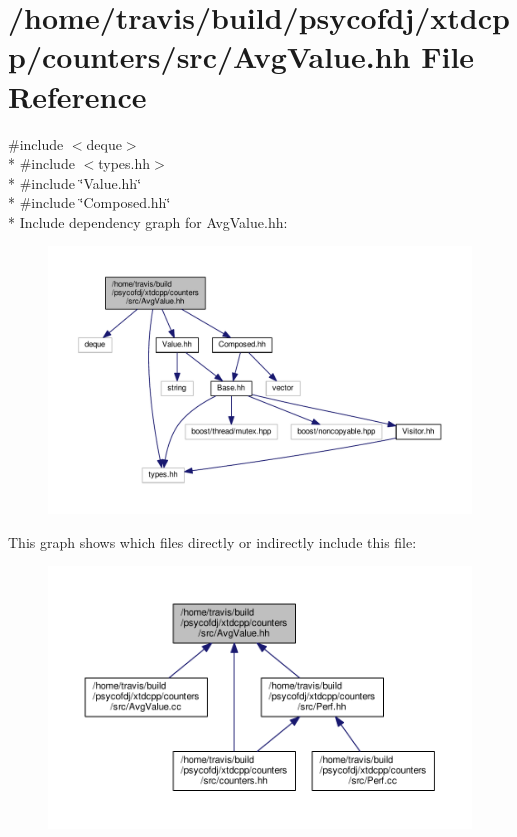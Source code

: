 \hypertarget{AvgValue_8hh}{\section{/home/travis/build/psycofdj/xtdcpp/counters/src/\-Avg\-Value.hh File Reference}
\label{AvgValue_8hh}
}
{\ttfamily \#include $<$deque$>$}\\*
{\ttfamily \#include $<$types.\-hh$>$}\\*
{\ttfamily \#include \char`\"{}Value.\-hh\char`\"{}}\\*
{\ttfamily \#include \char`\"{}Composed.\-hh\char`\"{}}\\*
Include dependency graph for Avg\-Value.\-hh\-:
\nopagebreak
\begin{figure}[H]
\begin{center}
\leavevmode
\includegraphics[width=350pt]{AvgValue_8hh__incl}
\end{center}
\end{figure}
This graph shows which files directly or indirectly include this file\-:
\nopagebreak
\begin{figure}[H]
\begin{center}
\leavevmode
\includegraphics[width=350pt]{AvgValue_8hh__dep__incl}
\end{center}
\end{figure}
